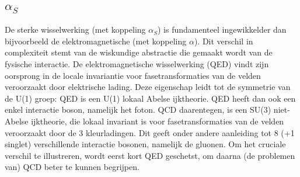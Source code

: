 \documentclass[a4paper,11pt]{article}
\numberwithin{equation}{section} %
\begin{document}
  \subsection{$\alpha_S$}
De sterke wisselwerking (met koppeling $\alpha_S$) is fundamenteel ingewikkelder dan bijvoorbeeld de elektromagnetische (met koppeling $\alpha$).
Dit verschil in complexiteit stemt van de wiskundige abstractie die gemaakt wordt van de fysische interactie.
De elektromagnetische wisselwerking (QED) vindt zijn oorsprong in de locale invariantie voor fasetransformaties van de velden veroorzaakt door elektrische lading.
Deze eigenschap leidt tot de symmetrie van de U(1) groep: QED is een U(1) lokaal Abelse ijktheorie.
QED heeft dan ook een enkel interactie boson, namelijk het foton.
QCD daarentegen, is een SU(3) niet-Abelse ijktheorie, die lokaal invariant is voor fasetransformaties van de velden veroorzaakt door de 3 kleurladingen.
Dit geeft onder andere aanleiding tot 8 (+1 singlet) verschillende interactie bosonen, namelijk de gluonen.
Om het cruciale verschil te illustreren, wordt eerst kort QED geschetst, om daarna (de problemen van) QCD beter te kunnen begrijpen.
\end{document}
